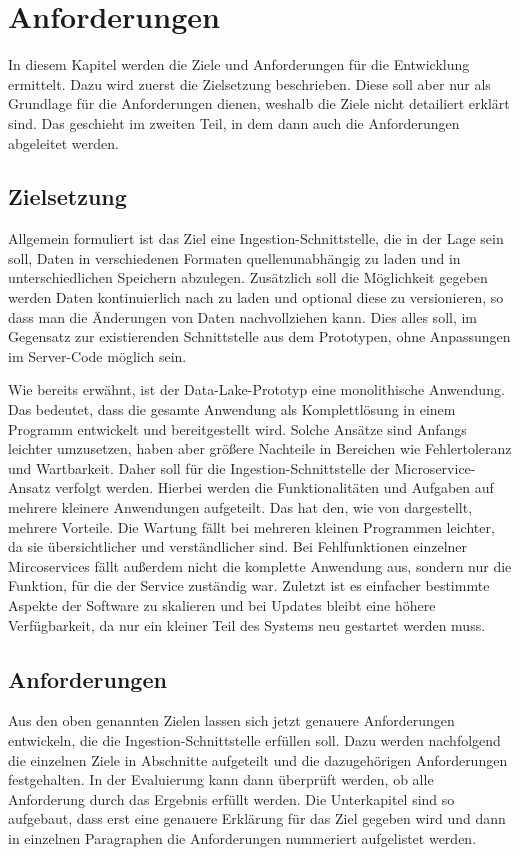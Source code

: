 \chapter{Anforderungen}
In diesem Kapitel werden die Ziele und Anforderungen für die Entwicklung ermittelt.
Dazu wird zuerst die Zielsetzung beschrieben.
Diese soll aber nur als Grundlage für die Anforderungen dienen, weshalb die Ziele nicht detailiert erklärt sind.
Das geschieht im zweiten Teil, in dem dann auch die Anforderungen abgeleitet werden.

\section{Zielsetzung}
Allgemein formuliert ist das Ziel eine Ingestion-Schnittstelle, die in der Lage sein soll, Daten in verschiedenen Formaten quellenunabhängig zu laden und in unterschiedlichen Speichern abzulegen.
Zusätzlich soll die Möglichkeit gegeben werden Daten kontinuierlich nach zu laden und optional diese zu versionieren, so dass man die Änderungen von Daten nachvollziehen kann.
Dies alles soll, im Gegensatz zur existierenden Schnittstelle aus dem Prototypen, ohne Anpassungen im Server-Code möglich sein.

Wie bereits erwähnt, ist der Data-Lake-Prototyp eine monolithische Anwendung.
Das bedeutet, dass die gesamte Anwendung als Komplettlösung in einem Programm entwickelt und bereitgestellt wird.
Solche Ansätze sind Anfangs leichter umzusetzen, haben aber größere Nachteile in Bereichen wie Fehlertoleranz und Wartbarkeit.
Daher soll für die Ingestion-Schnittstelle der Microservice-Ansatz verfolgt werden.
Hierbei werden die Funktionalitäten und Aufgaben auf mehrere kleinere Anwendungen aufgeteilt.
Das hat den, wie von \textcite{microservices} dargestellt, mehrere Vorteile.
Die Wartung fällt bei mehreren kleinen Programmen leichter, da sie übersichtlicher und verständlicher sind.
Bei Fehlfunktionen einzelner Mircoservices fällt außerdem nicht die komplette Anwendung aus, sondern nur die Funktion, für die der Service zuständig war.
Zuletzt ist es einfacher bestimmte Aspekte der Software zu skalieren und bei Updates bleibt eine höhere Verfügbarkeit, da nur ein kleiner Teil des Systems neu gestartet werden muss.

\section{Anforderungen}
Aus den oben genannten Zielen lassen sich jetzt genauere Anforderungen entwickeln, die die Ingestion-Schnittstelle erfüllen soll.
Dazu werden nachfolgend die einzelnen Ziele in Abschnitte aufgeteilt und die dazugehörigen Anforderungen festgehalten.
In der Evaluierung kann dann überprüft werden, ob alle Anforderung durch das Ergebnis erfüllt werden.
Die Unterkapitel sind so aufgebaut, dass erst eine genauere Erklärung für das Ziel gegeben wird und dann in einzelnen Paragraphen die Anforderungen nummeriert aufgelistet werden.

